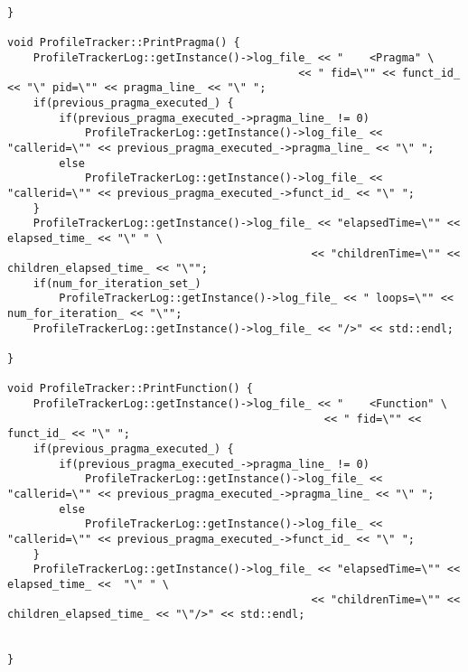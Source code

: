 \documentclass[a4paper,10pt,twoside]{book}
\begin{document}
\begin{lstlisting}[language=CCC, caption=profile\_tracker.cpp]
}
 
void ProfileTracker::PrintPragma() {
	ProfileTrackerLog::getInstance()->log_file_ << "	<Pragma" \
											 << " fid=\"" << funct_id_ << "\" pid=\"" << pragma_line_ << "\" ";
	if(previous_pragma_executed_) {
		if(previous_pragma_executed_->pragma_line_ != 0)
			ProfileTrackerLog::getInstance()->log_file_ << "callerid=\"" << previous_pragma_executed_->pragma_line_ << "\" "; 
		else 
			ProfileTrackerLog::getInstance()->log_file_ << "callerid=\"" << previous_pragma_executed_->funct_id_ << "\" "; 
	}
	ProfileTrackerLog::getInstance()->log_file_ << "elapsedTime=\"" << elapsed_time_ << "\" " \
											   << "childrenTime=\"" << children_elapsed_time_ << "\"";
	if(num_for_iteration_set_)
	 	ProfileTrackerLog::getInstance()->log_file_ << " loops=\"" << num_for_iteration_ << "\"";
	ProfileTrackerLog::getInstance()->log_file_ << "/>" << std::endl; 

}

void ProfileTracker::PrintFunction() {
	ProfileTrackerLog::getInstance()->log_file_ << "	<Function" \
												 << " fid=\"" << funct_id_ << "\" ";
	if(previous_pragma_executed_) {
		if(previous_pragma_executed_->pragma_line_ != 0)
			ProfileTrackerLog::getInstance()->log_file_ << "callerid=\"" << previous_pragma_executed_->pragma_line_ << "\" "; 
		else 
			ProfileTrackerLog::getInstance()->log_file_ << "callerid=\"" << previous_pragma_executed_->funct_id_ << "\" "; 
	}
	ProfileTrackerLog::getInstance()->log_file_ << "elapsedTime=\"" << elapsed_time_ <<  "\" " \
											   << "childrenTime=\"" << children_elapsed_time_ << "\"/>" << std::endl; 


}
\end{lstlisting}
\end{document}

